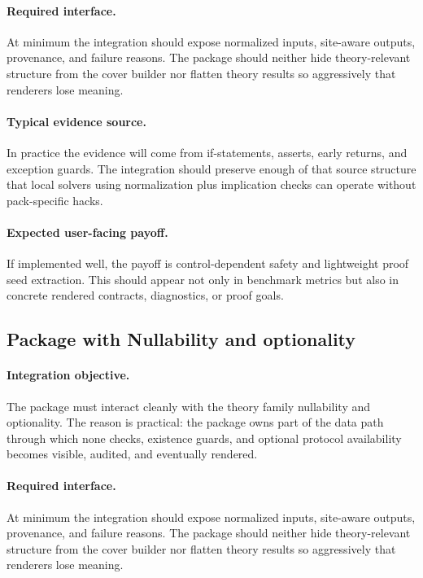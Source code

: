 \documentclass[11pt]{report}
\DeclareRobustCommand{\py}[1]{\texttt{\detokenize{#1}}}
\theoremstyle{definition}
\theoremstyle{plain}
\begin{document}
\paragraph{Required interface.}
At minimum the integration should expose normalized inputs, site-aware
outputs, provenance, and failure reasons. The package should neither hide
theory-relevant structure from the cover builder nor flatten theory
results so aggressively that renderers lose meaning.

\paragraph{Typical evidence source.}
In practice the evidence will come from if-statements, asserts, early returns, and exception guards. The integration should
preserve enough of that source structure that local solvers using normalization plus implication checks
can operate without pack-specific hacks.

\paragraph{Expected user-facing payoff.}
If implemented well, the payoff is control-dependent safety and lightweight proof seed extraction. This should appear not only
in benchmark metrics but also in concrete rendered contracts,
diagnostics, or proof goals.


\subsection{Package \py{src/deppy/assist} with Nullability and optionality}

\paragraph{Integration objective.}
The package \py{src/deppy/assist} must interact cleanly with the
theory family nullability and optionality. The reason is practical: the
package owns part of the data path through which none checks, existence guards, and optional protocol availability becomes
visible, audited, and eventually rendered.

\paragraph{Required interface.}
At minimum the integration should expose normalized inputs, site-aware
outputs, provenance, and failure reasons. The package should neither hide
theory-relevant structure from the cover builder nor flatten theory
results so aggressively that renderers lose meaning.
\end{document}
